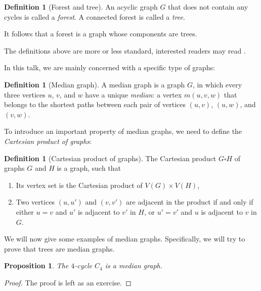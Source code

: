 \documentclass[12pt, a4paper]{article}
\theoremstyle{plain}
\newtheorem{proposition}[theorem]{Proposition}
\theoremstyle{definition}
\newtheorem{definition}[theorem]{Definition}
\theoremstyle{remark}
\begin{document}
    \begin{definition}[Forest and tree]
        An acyclic graph $G$ that does not contain any cycles is called a \textit{forest}. A connected forest is called a \textit{tree}.
        
        It follows that a forest is a graph whose components are trees.
    \end{definition}
    
    The definitions above are more or less standard, interested readers may read \cite{bollobas}.
    
    In this talk, we are mainly concerned with a specific type of graphs:
    
    \begin{definition}[Median graph]
        A median graph is a graph $G$, in which every three vertices $u$, $v$, and $w$ have a unique \textit{median}: a vertex $m(u, v, w)$ that belongs to the shortest paths between each pair of vertices $(u, v)$, $(u, w)$, and $(v, w)$.
    \end{definition}
    
    To introduce an important property of median graphs, we need to define the \textit{Cartesian product of graphs}:
    
    \begin{definition}[Cartesian product of graphs]
        The Cartesian product $G \square H$ of graphs $G$ and $H$ is a graph, such that
        \begin{enumerate}
            \item Its vertex set is the Cartesian product of $V(G) \times V(H)$,
            \item Two vertices $(u, u')$ and $(v, v')$ are adjacent in the product if and only if either $u = v$ and $u'$ is adjacent to $v'$ in $H$, or $u' = v'$ and $u$ is adjacent to $v$ in $G$.
        \end{enumerate}
    \end{definition}
    
    We will now give some examples of median graphs. Specifically, we will try to prove that trees are median graphs.
    
    \begin{proposition}
        The $4$-cycle $C_{4}$ is a median graph.
    \end{proposition}
    
    \begin{proof}
        The proof is left as an exercise.
    \end{proof}
    
\end{document}
